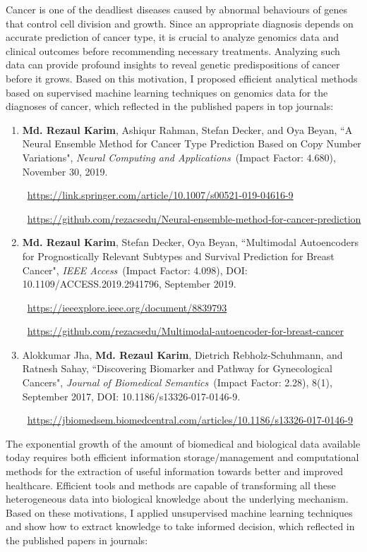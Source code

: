 \begin{appendices}
Cancer is one of the deadliest diseases caused by abnormal behaviours of genes that control cell division and growth. Since an appropriate diagnosis depends on accurate prediction of cancer type, it is crucial to analyze genomics data and clinical outcomes before recommending necessary treatments. Analyzing such data can provide profound insights to reveal genetic predispositions of cancer before it grows. Based on this motivation, I proposed efficient analytical methods based on supervised machine learning techniques on genomics data for the diagnoses of cancer, which reflected in the published papers in top journals: 

\begin{enumerate}[noitemsep]
	\item \textbf{Md. Rezaul Karim}, Ashiqur Rahman, Stefan Decker, and Oya Beyan, ``A Neural Ensemble Method for Cancer Type Prediction Based on Copy Number Variations", \emph{Neural Computing and Applications}~(Impact Factor: 4.680), November 30, 2019. 
	
	\faLink~\url{https://link.springer.com/article/10.1007/s00521-019-04616-9}
	
	\faGithub~\url{https://github.com/rezacsedu/Neural-ensemble-method-for-cancer-prediction} 
	
	\item \textbf{Md. Rezaul Karim}, Stefan Decker, Oya Beyan, ``Multimodal Autoencoders for Prognostically Relevant Subtypes and Survival Prediction for Breast Cancer", \emph{IEEE Access}~(Impact Factor: 4.098), DOI: 10.1109/ACCESS.2019.2941796, September 2019.
	
	\faLink~\url{https://ieeexplore.ieee.org/document/8839793}
	
	\faGithub~\url{https://github.com/rezacsedu/Multimodal-autoencoder-for-breast-cancer} 
	
	\item {Alokkumar Jha, {\bf Md. Rezaul Karim}, Dietrich Rebholz-Schuhmann, and Ratnesh Sahay, ``Discovering Biomarker and Pathway for Gynecological Cancers", \emph{Journal of Biomedical Semantics}~(Impact Factor: 2.28), 8(1), September 2017, DOI: 10.1186/s13326-017-0146-9.} 
	
	\faLink~\url{https://jbiomedsem.biomedcentral.com/articles/10.1186/s13326-017-0146-9}
\end{enumerate}

The exponential growth of the amount of biomedical and biological data available today requires both efficient information storage/management and computational methods for the extraction of useful information towards better and improved healthcare. Efficient tools and methods are capable of transforming all these heterogeneous data into biological knowledge about the underlying mechanism. Based on these motivations, I applied unsupervised machine learning techniques and show how to extract knowledge to take informed decision, which reflected in the published papers in journals:


\end{appendices}
